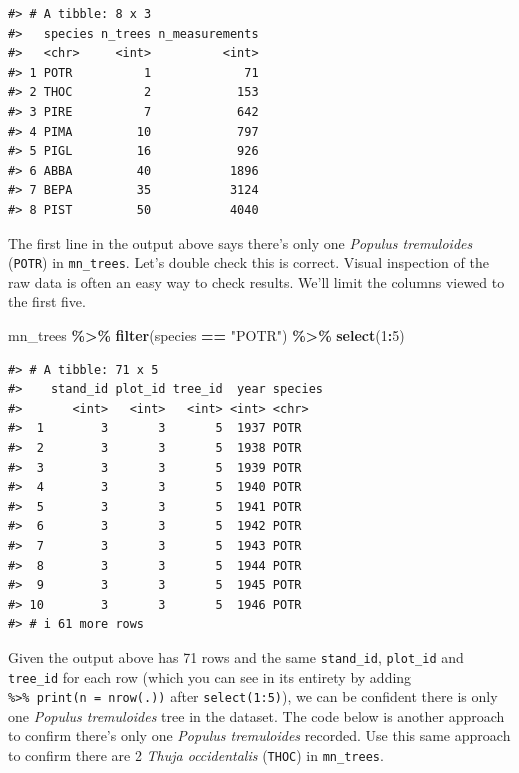 \documentclass[
  11pt,
]{krantz}
\newenvironment{Shaded}{\begin{snugshade}}{\end{snugshade}}
\newcommand{\DecValTok}[1]{\textcolor[rgb]{0.00,0.00,0.81}{#1}}
\newcommand{\KeywordTok}[1]{\textcolor[rgb]{0.13,0.29,0.53}{\textbf{#1}}}
\newcommand{\NormalTok}[1]{#1}
\newcommand{\OperatorTok}[1]{\textcolor[rgb]{0.81,0.36,0.00}{\textbf{#1}}}
\newcommand{\StringTok}[1]{\textcolor[rgb]{0.31,0.60,0.02}{#1}}
\theoremstyle{definition}
\theoremstyle{definition}
\theoremstyle{definition}
\theoremstyle{definition}
\theoremstyle{remark}
\begin{document}
\begin{verbatim}
#> # A tibble: 8 x 3
#>   species n_trees n_measurements
#>   <chr>     <int>          <int>
#> 1 POTR          1             71
#> 2 THOC          2            153
#> 3 PIRE          7            642
#> 4 PIMA         10            797
#> 5 PIGL         16            926
#> 6 ABBA         40           1896
#> 7 BEPA         35           3124
#> 8 PIST         50           4040
\end{verbatim}

The first line in the output above says there's only one \emph{Populus tremuloides} (\texttt{POTR}) in \texttt{mn\_trees}. Let's double check this is correct. Visual inspection of the raw data is often an easy way to check results. We'll limit the columns viewed to the first five.

\begin{Shaded}
\begin{Highlighting}[]
\NormalTok{mn\_trees }\OperatorTok{\%\textgreater{}\%}\StringTok{ }\KeywordTok{filter}\NormalTok{(species }\OperatorTok{==}\StringTok{ "POTR"}\NormalTok{) }\OperatorTok{\%\textgreater{}\%}\StringTok{ }\KeywordTok{select}\NormalTok{(}\DecValTok{1}\OperatorTok{:}\DecValTok{5}\NormalTok{)}
\end{Highlighting}
\end{Shaded}

\begin{verbatim}
#> # A tibble: 71 x 5
#>    stand_id plot_id tree_id  year species
#>       <int>   <int>   <int> <int> <chr>  
#>  1        3       3       5  1937 POTR   
#>  2        3       3       5  1938 POTR   
#>  3        3       3       5  1939 POTR   
#>  4        3       3       5  1940 POTR   
#>  5        3       3       5  1941 POTR   
#>  6        3       3       5  1942 POTR   
#>  7        3       3       5  1943 POTR   
#>  8        3       3       5  1944 POTR   
#>  9        3       3       5  1945 POTR   
#> 10        3       3       5  1946 POTR   
#> # i 61 more rows
\end{verbatim}

Given the output above has 71 rows and the same \texttt{stand\_id}, \texttt{plot\_id} and \texttt{tree\_id} for each row (which you can see in its entirety by adding \texttt{\%\textgreater{}\%\ print(n\ =\ nrow(.))} after \texttt{select(1:5)}), we can be confident there is only one \emph{Populus tremuloides} tree in the dataset. The code below is another approach to confirm there's only one \emph{Populus tremuloides} recorded. Use this same approach to confirm there are 2 \emph{Thuja occidentalis} (\texttt{THOC}) in \texttt{mn\_trees}.
\end{document}
